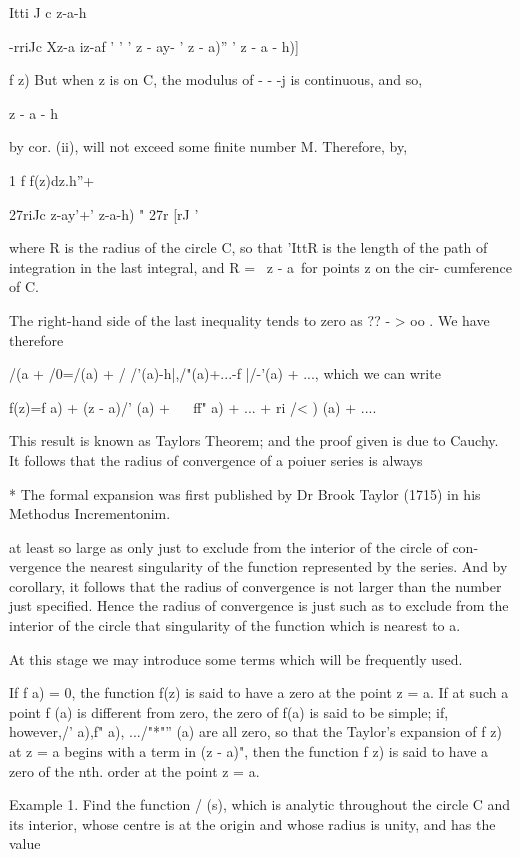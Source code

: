 {{    Itti J c z-a-h

 -rriJc Xz-a iz-af ' ' ' z - ay- ' z - a)'' ' z - a - h)]

f z) But when z is on C, the modulus of - - -j is continuous, and so,

z - a - h

by cor. (ii), will not exceed some finite number M. Therefore,
by,

1 f f(z)dz.h''+

27riJc z-ay'+' z-a-h) " 27r [rJ '

where R is the radius of the circle C, so that 'IttR is the length of
the path of integration in the last integral, and R = \ z - a\ for
points z on the cir- cumference of C.

The right-hand side of the last inequality tends to zero as ?? - > oo
. We have therefore

/(a + /0=/(a) + / /'(a)-h|,/"(a)+...-f |/-'(a) + ..., which we can
write

f(z)=f a) + (z - a)/' (a) + ~ ~ff" a) + ... + ri /< ) (a) + ....

This result is known as Taylors Theorem; and the proof given is due
to Cauchy. It follows that the radius of convergence of a poiuer
series is always

* The formal expansion was first published by Dr Brook Taylor (1715)
in his Methodus Incrementonim.

%
%

at least so large as only just to exclude from the interior of the
circle of con- vergence the nearest singularity of the function
represented by the series. And by corollary, it follows that the
radius of convergence is not larger than the number just specified.
Hence the radius of convergence is just such as to exclude from the
interior of the circle that singularity of the function which is
nearest to a.

At this stage we may introduce some terms which will be frequently
used.

If f a) = 0, the function f(z) is said to have a zero at the point z =
a. If at such a point f (a) is different from zero, the zero of f(a)
is said to be simple; if, however,/' a),f" a), .../"*"'' (a) are all
zero, so that the Taylor's expansion of f z) at z = a begins with a
term in (z - a)", then the function f z) is said to have a zero of the
nth. order at the point z = a.

Example 1. Find the function / (s), which is analytic throughout the
circle C and its interior, whose centre is at the origin and whose
radius is unity, and has the value

}}
